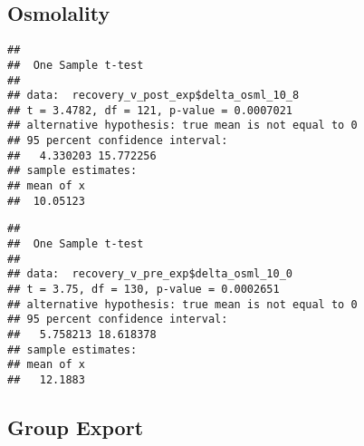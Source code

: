 \documentclass[
]{article}
\newenvironment{Shaded}{\begin{snugshade}}{\end{snugshade}}
\newcommand{\AttributeTok}[1]{\textcolor[rgb]{0.77,0.63,0.00}{#1}}
\newcommand{\DecValTok}[1]{\textcolor[rgb]{0.00,0.00,0.81}{#1}}
\newcommand{\FunctionTok}[1]{\textcolor[rgb]{0.00,0.00,0.00}{#1}}
\newcommand{\NormalTok}[1]{#1}
\newcommand{\OtherTok}[1]{\textcolor[rgb]{0.56,0.35,0.01}{#1}}
\newcommand{\SpecialCharTok}[1]{\textcolor[rgb]{0.00,0.00,0.00}{#1}}
\newcommand{\StringTok}[1]{\textcolor[rgb]{0.31,0.60,0.02}{#1}}
\begin{document}
\hypertarget{osmolality-1}{%
\subsection{Osmolality}\label{osmolality-1}}

\begin{Shaded}
\end{Shaded}

\begin{verbatim}
## 
##  One Sample t-test
## 
## data:  recovery_v_post_exp$delta_osml_10_8
## t = 3.4782, df = 121, p-value = 0.0007021
## alternative hypothesis: true mean is not equal to 0
## 95 percent confidence interval:
##   4.330203 15.772256
## sample estimates:
## mean of x 
##  10.05123
\end{verbatim}

\begin{Shaded}
\end{Shaded}

\begin{verbatim}
## 
##  One Sample t-test
## 
## data:  recovery_v_pre_exp$delta_osml_10_0
## t = 3.75, df = 130, p-value = 0.0002651
## alternative hypothesis: true mean is not equal to 0
## 95 percent confidence interval:
##   5.758213 18.618378
## sample estimates:
## mean of x 
##   12.1883
\end{verbatim}

\hypertarget{group-export-1}{%
\subsection{Group Export}\label{group-export-1}}
\end{document}
